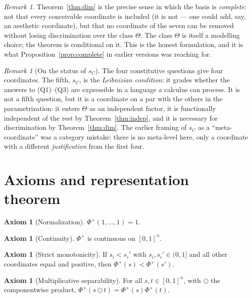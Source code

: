 \documentclass[11pt]{article}
\theoremstyle{definition}
\newtheorem{axiom}[theorem]{Axiom}
\theoremstyle{remark}
\newtheorem{remark}[theorem]{Remark}
\newcommand{\Ph}{\Phi^{+}}
\newcommand{\Th}{\Theta}
\newcommand{\sC}{s_C}
\begin{document}
\begin{remark}
Theorem~\ref{thm:dim} is the precise sense in which the basis is \emph{complete}: not that every conceivable coordinate is included (it is not --- one could add, say, an aesthetic coordinate), but that no coordinate of the seven can be removed without losing discrimination over the class $\Th$. The class $\Th$ is itself a modelling choice; the theorem is conditional on it. This is the honest formulation, and it is what Proposition~\ref{prop:complete} in earlier versions was reaching for.
\end{remark}

\begin{remark}[On the status of $\sC$]\label{rem:five}
The four constitutive questions give four coordinates. The fifth, $\sC$, is the \emph{Leibnizian condition}: it grades whether the answers to (Q1)--(Q3) are expressible in a language a calculus can process. It is not a fifth question, but it is a coordinate on a par with the others in the parametrization: it enters $\Th$ as an independent factor, it is functionally independent of the rest by Theorem~\ref{thm:indep}, and it is necessary for discrimination by Theorem~\ref{thm:dim}. The earlier framing of $\sC$ as a ``meta-coordinate'' was a category mistake: there is no meta-level here, only a coordinate with a different \emph{justification} from the first four.
\end{remark}

\section{Axioms and representation theorem}\label{sec:rep}

\begin{axiom}[Normalization]\label{ax:norm}
$\Ph(1,\dots,1)=1$.
\end{axiom}

\begin{axiom}[Continuity]\label{ax:cont}
$\Ph$ is continuous on $[0,1]^n$.
\end{axiom}

\begin{axiom}[Strict monotonicity]\label{ax:mono}
If $s_i<s_i'$ with $s_i,s_i'\in(0,1]$ and all other coordinates equal and positive, then $\Ph(s)<\Ph(s')$.
\end{axiom}

\begin{axiom}[Multiplicative separability]\label{ax:mult}
For all $s,t\in[0,1]^n$, with $\odot$ the componentwise product, $\Ph(s\odot t)=\Ph(s)\Ph(t)$.
\end{axiom}
\end{document}
